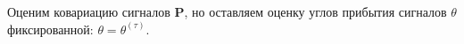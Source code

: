 \documentclass[11pt]{article}
\begin{document}
Оценим ковариацию сигналов $\mathbf{P}$, но оставляем оценку углов прибытия сигналов $\theta$ фиксированной: $\theta = \theta^{(\tau)}$.
\begin{center}
\fontsize{16}{20}\selectfont {}
\end{center}
\begin{center}
\fontsize{14}{18}\selectfont {}
\end{center}
\begin{center}
\fontsize{14}{18}\selectfont {}
\end{center}
\begin{center}
\fontsize{14}{18}\selectfont {}
\end{center}
\begin{center}
\fontsize{14}{18}\selectfont {}
\end{center}
\begin{center}
\fontsize{16}{20}\selectfont {}
\end{center}
\end{document}
